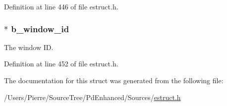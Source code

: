 Definition at line 446 of file estruct.\-h.

\hypertarget{struct__ebox_a7033df943e798c68e3a6117785c2d79e}{
\subsubsection[{b\-\_\-window\-\_\-id}]{$\ast$ b\-\_\-window\-\_\-id}}\label{struct__ebox_a7033df943e798c68e3a6117785c2d79e}
The window I\-D. 

Definition at line 452 of file estruct.\-h.



The documentation for this struct was generated from the following file\-:\begin{DoxyCompactItemize}
\item 
/\-Users/\-Pierre/\-Source\-Tree/\-Pd\-Enhanced/\-Sources/\hyperlink{estruct_8h}{estruct.\-h}\end{DoxyCompactItemize}
